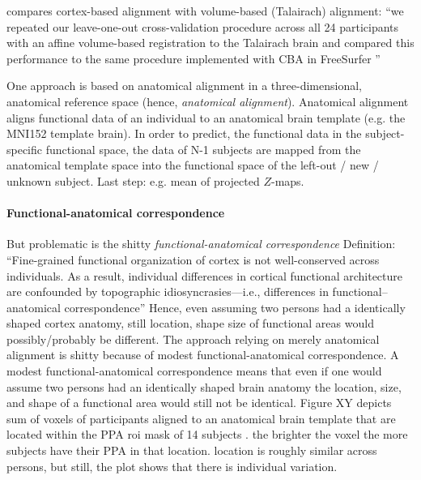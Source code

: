 \citep{weiner2018defining} compares cortex-based alignment
\citep{fischl1999high} with volume-based (Talairach) alignment: ``we repeated
our leave-one-out cross-validation procedure across all 24 participants with an
affine volume-based registration to the Talairach brain and compared this
performance to the same procedure implemented with CBA in FreeSurfer
\citep{weiner2018defining}''

One approach is based on anatomical alignment in a three-dimensional, anatomical
reference space (hence, \textit{anatomical alignment}).
%
Anatomical alignment aligns functional data of an individual to an anatomical
brain template (e.g. the MNI152 template brain).
%
In order to predict, the functional data in the subject-specific functional
space, the data of N-1 subjects are mapped from the anatomical template space
into the functional space of the left-out / new / unknown subject.
%
Last step: e.g. mean of projected $Z$-maps.



\paragraph{Functional-anatomical correspondence}

But problematic is the shitty \textit{functional-anatomical correspondence}
Definition: ``Fine-grained functional organization of cortex is not
well-conserved across individuals. As a result, individual differences in
cortical functional architecture are confounded by topographic
idiosyncrasies—i.e., differences in functional–anatomical correspondence''
\citep{feilong2018reliable}
Hence, even assuming two persons had a identically shaped cortex anatomy, still
location, shape size of functional areas would possibly/probably be different.
The approach relying on merely anatomical alignment is shitty because of modest
functional-anatomical correspondence.
A modest functional-anatomical correspondence means that even if one would
assume two persons had an identically shaped brain anatomy the location, size,
and shape of a functional area would still not be identical.
%
Figure XY depicts sum of voxels of participants aligned to an anatomical brain
template that are located within the \ac{PPA} \ac{roi} mask of 14 subjects
\citep{sengupta2016extension}.
%
the brighter the voxel the more subjects have their PPA in that location.
%
location is roughly similar across persons, but still, the plot shows that there
is individual variation.


